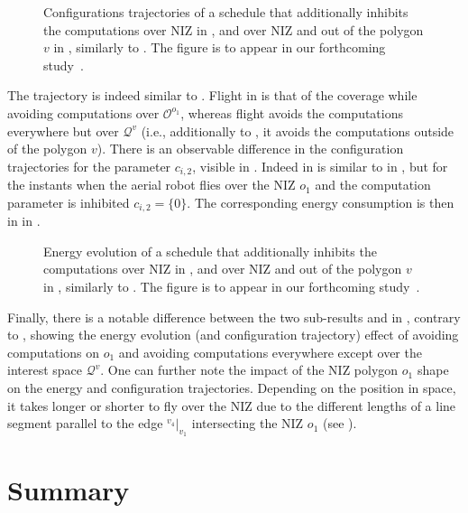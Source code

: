 \begin{figure}[h!]
  \centering
  \selectfont
  \footnotesize    
  
  \caption[The configuration effect of inhibiting computations over NIZ and out of the polygon]{Configurations trajectories of a schedule that additionally inhibits the computations over NIZ in , and over NIZ and out of the polygon $v$ in , similarly to . The figure is to appear in our forthcoming study~\citep{seewald202Xenergy}.}
  \label{fig:ctls-niz}
\end{figure}
The trajectory is indeed similar to . Flight  in  is that of the coverage while avoiding computations over $\mathcal{O}^{o_1}$, whereas flight  avoids the computations everywhere but over $\mathcal{Q}^v$ (i.e., additionally to , it avoids the computations outside of the polygon $v$). There is an observable difference in the configuration trajectories for the parameter $c_{i,2}$, visible in . Indeed  in  is similar to  in , but for the instants when the aerial robot flies over the NIZ $o_1$ and the computation parameter is inhibited $c_{i,2}=\{0\}$. The corresponding energy consumption is then in  in .

\begin{figure}[h!]
  \centering
  \selectfont
  \footnotesize    
  
  \caption[The energy effect of inhibiting computations over NIZ and out of the polygon]{Energy evolution of a schedule that additionally inhibits the computations over NIZ in , and over NIZ and out of the polygon $v$ in , similarly to . The figure is to appear in our forthcoming study~\citep{seewald202Xenergy}.}
  \label{fig:ener-niz}
\end{figure}
Finally, there is a notable difference between the two sub-results  and  in , contrary to , showing the energy evolution (and configuration trajectory) effect of avoiding computations on $o_1$ and avoiding computations everywhere except over the interest space $\mathcal{Q}^v$. One can further note the impact of the NIZ polygon $o_1$ shape on the energy and configuration trajectories. Depending on the position in space, it takes longer or shorter to fly over the NIZ due to the different lengths of a line segment parallel to the edge ${}^{v_4}|_{v_1}$ intersecting the NIZ $o_1$ (see ).


\section{\color{red}Summary}

